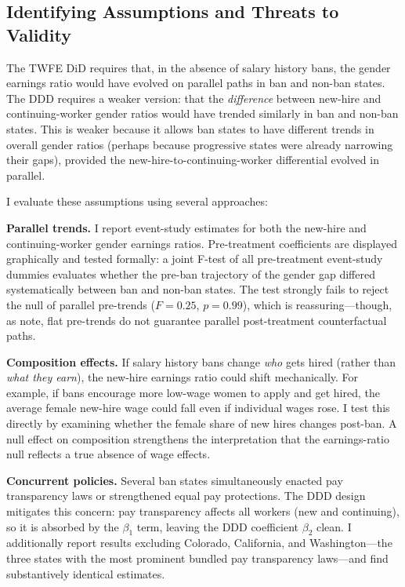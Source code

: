 \documentclass[12pt]{article}
\begin{document}
\subsection{Identifying Assumptions and Threats to Validity}

The TWFE DiD requires that, in the absence of salary history bans, the gender earnings ratio would have evolved on parallel paths in ban and non-ban states. The DDD requires a weaker version: that the \textit{difference} between new-hire and continuing-worker gender ratios would have trended similarly in ban and non-ban states. This is weaker because it allows ban states to have different trends in overall gender ratios (perhaps because progressive states were already narrowing their gaps), provided the new-hire-to-continuing-worker differential evolved in parallel.

I evaluate these assumptions using several approaches:

\textbf{Parallel trends.} I report event-study estimates for both the new-hire and continuing-worker gender earnings ratios. Pre-treatment coefficients are displayed graphically and tested formally: a joint F-test of all pre-treatment event-study dummies evaluates whether the pre-ban trajectory of the gender gap differed systematically between ban and non-ban states. The test strongly fails to reject the null of parallel pre-trends ($F = 0.25$, $p = 0.99$), which is reassuring---though, as \citet{sun2021estimating} note, flat pre-trends do not guarantee parallel post-treatment counterfactual paths.

\textbf{Composition effects.} If salary history bans change \textit{who} gets hired (rather than \textit{what they earn}), the new-hire earnings ratio could shift mechanically. For example, if bans encourage more low-wage women to apply and get hired, the average female new-hire wage could fall even if individual wages rose. I test this directly by examining whether the female share of new hires changes post-ban. A null effect on composition strengthens the interpretation that the earnings-ratio null reflects a true absence of wage effects.

\textbf{Concurrent policies.} Several ban states simultaneously enacted pay transparency laws or strengthened equal pay protections. The DDD design mitigates this concern: pay transparency affects all workers (new and continuing), so it is absorbed by the $\beta_1$ term, leaving the DDD coefficient $\beta_2$ clean. I additionally report results excluding Colorado, California, and Washington---the three states with the most prominent bundled pay transparency laws---and find substantively identical estimates.
\end{document}
